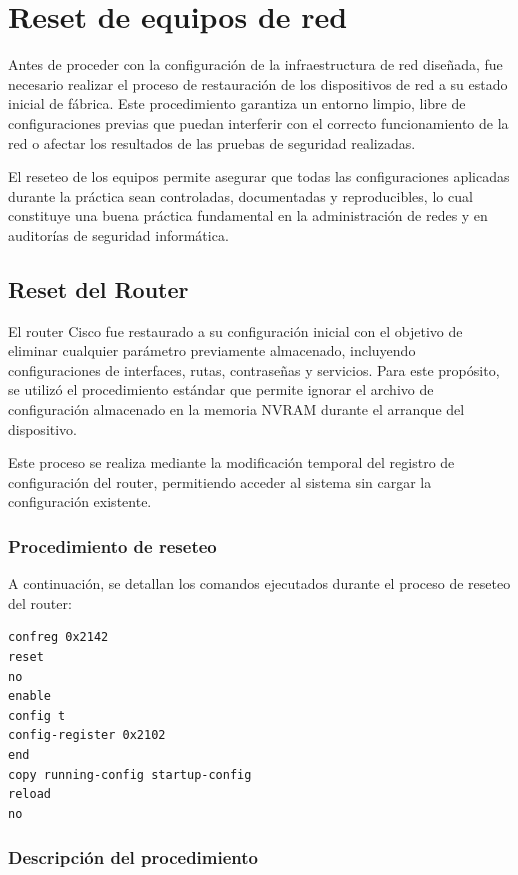 \section{Reset de equipos de red}

Antes de proceder con la configuración de la infraestructura de red diseñada, fue necesario realizar el proceso de restauración de los dispositivos de red a su estado inicial de fábrica. Este procedimiento garantiza un entorno limpio, libre de configuraciones previas que puedan interferir con el correcto funcionamiento de la red o afectar los resultados de las pruebas de seguridad realizadas.

El reseteo de los equipos permite asegurar que todas las configuraciones aplicadas durante la práctica sean controladas, documentadas y reproducibles, lo cual constituye una buena práctica fundamental en la administración de redes y en auditorías de seguridad informática.

\subsection{Reset del Router}

El router Cisco fue restaurado a su configuración inicial con el objetivo de eliminar cualquier parámetro previamente almacenado, incluyendo configuraciones de interfaces, rutas, contraseñas y servicios. Para este propósito, se utilizó el procedimiento estándar que permite ignorar el archivo de configuración almacenado en la memoria NVRAM durante el arranque del dispositivo.

Este proceso se realiza mediante la modificación temporal del registro de configuración del router, permitiendo acceder al sistema sin cargar la configuración existente.

\subsubsection{Procedimiento de reseteo}

A continuación, se detallan los comandos ejecutados durante el proceso de reseteo del router:

\begin{lstlisting}[caption={Comandos utilizados para el reset del Router Cisco}]
confreg 0x2142
reset
no
enable
config t
config-register 0x2102
end
copy running-config startup-config
reload
no
\end{lstlisting}

\subsubsection{Descripción del procedimiento}

